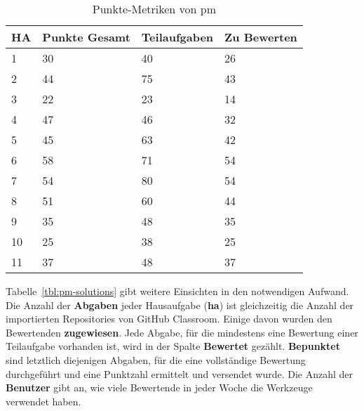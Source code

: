 \begin{table}
    \centering
    \caption{Punkte-Metriken von \ac{pm}}
    \begin{tabular}{|l|l|l|l|}
    \hline
        HA & Punkte Gesamt & Teilaufgaben & Zu Bewerten \\ \hline
        1  & 30 & 40 & 26 \\ \hline
        2  & 44 & 75 & 43 \\ \hline
        3  & 22 & 23 & 14 \\ \hline
        4  & 47 & 46 & 32 \\ \hline
        5  & 45 & 63 & 42 \\ \hline
        6  & 58 & 71 & 54 \\ \hline
        7  & 54 & 80 & 54 \\ \hline
        8  & 51 & 60 & 44 \\ \hline
        9  & 35 & 48 & 35 \\ \hline
        10 & 25 & 38 & 25 \\ \hline
        11 & 37 & 48 & 37 \\ \hline
    \end{tabular}
    \label{tbl:pm-points}
\end{table}

Tabelle~\ref{tbl:pm-solutions} gibt weitere Einsichten in den notwendigen Aufwand.
Die Anzahl der \textbf{Abgaben} jeder Hausaufgabe (\textbf{\acs{ha}}) ist gleichzeitig die Anzahl der importierten Repositories von GitHub Classroom.
Einige davon wurden den Bewertenden \textbf{zugewiesen}.
Jede Abgabe, für die mindestens eine Bewertung einer Teilaufgabe vorhanden ist, wird in der Spalte \textbf{Bewertet} gezählt.
\textbf{Bepunktet} sind letztlich diejenigen Abgaben, für die eine vollständige Bewertung durchgeführt und eine Punktzahl ermittelt und versendet wurde.
Die Anzahl der \textbf{Benutzer} gibt an, wie viele Bewertende in jeder Woche die Werkzeuge verwendet haben.

